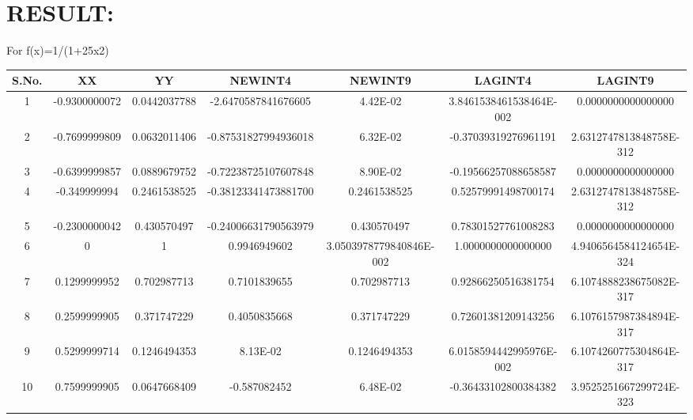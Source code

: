 \documentclass[10pt,a4paper]{article}
\begin{document}
\section{RESULT:}
For	f(x)=1/(1+25x2)\\
        \begin{center}
        	\begin{tabular}{|c| c| c| c| c| c| c|}
        			
        	 
        		\hline
					
		S.No.	&XX	&YY	&NEWINT4	&NEWINT9 	&LAGINT4	&LAGINT9\\
		\hline
		1	&-0.9300000072	&0.0442037788	&-2.6470587841676605	&4.42E-02	&3.8461538461538464E-002	&0.0000000000000000 \\
		\hline
		2	&-0.7699999809	&0.0632011406	&-0.87531827994936018	&6.32E-02	&-0.37039319276961191	&2.6312747813848758E-312\\
		\hline
		3	&-0.6399999857	&0.0889679752	&-0.72238725107607848	&8.90E-02	&-0.19566257088658587	&0.0000000000000000\\
		\hline
		4	&-0.349999994	&0.2461538525	&-0.38123341473881700	&0.2461538525	&0.52579991498700174	&2.6312747813848758E-312\\
		\hline
		5	&-0.2300000042	&0.430570497	&-0.24006631790563979	&0.430570497	&0.78301527761008283	&0.0000000000000000\\
		\hline
		6	&0	&1	&0.9946949602	&3.0503978779840846E-002	&1.0000000000000000 	&4.9406564584124654E-324\\
		\hline
		7	&0.1299999952	&0.702987713	&0.7101839655	&0.702987713	&0.92866250516381754	&6.1074888238675082E-317\\
		\hline
		8	&0.2599999905	&0.371747229	&0.4050835668	&0.371747229	&0.72601381209143256	&6.1076157987384894E-317\\
		\hline
		9	&0.5299999714	&0.1246494353	&8.13E-02	&0.1246494353	&6.0158594442995976E-002	&6.1074260775304864E-317\\
		\hline
		10	&0.7599999905	&0.0647668409	&-0.587082452	&6.48E-02	&-0.36433102800384382	&3.9525251667299724E-323\\
		\hline
	\end{tabular}
\end{center}
\end{document}
